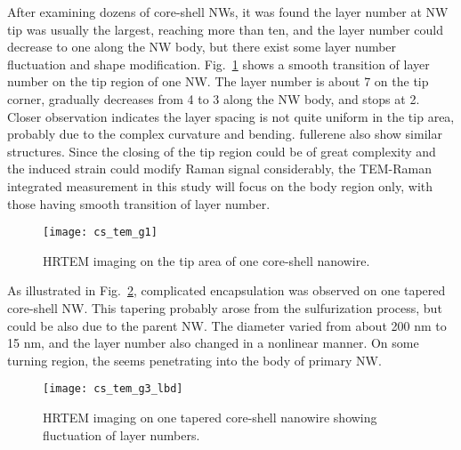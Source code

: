 After examining dozens of core-shell NWs, it was found the  layer number at NW tip was usually the largest, reaching more than ten, and the layer number could decrease to one along the NW body, but there exist some layer number fluctuation and shape modification. Fig.~\ref{fig:ch5ws2tem3} shows a smooth transition of  layer number on the tip region of one NW. The layer number is about 7 on the tip corner, gradually decreases from 4 to 3 along the NW body, and stops at 2. Closer observation indicates the layer spacing is not quite uniform in the tip area, probably due to the complex curvature and bending.  fullerene also show similar structures. Since the closing of the tip region could be of great complexity and the induced strain could modify Raman signal considerably, the TEM-Raman integrated measurement in this study will focus on the body region only, with those having smooth transition of layer number.
\begin{figure}[htb]
\centering
\texttt{[image: cs\_tem\_g1]}
\caption[HRTEM imaging on the tip area of one core-shell nanowire]{HRTEM imaging on the tip area of one core-shell nanowire.}
\label{fig:ch5ws2tem3}
\end{figure}
As illustrated in Fig.~\ref{fig:ch5ws2tem4}, complicated  encapsulation was observed on one tapered core-shell NW. This tapering probably arose from the sulfurization process, but could be also due to the parent  NW. The diameter varied from about 200 nm to 15 nm, and the  layer number also changed in a nonlinear manner. On some turning region, the  seems penetrating into the body of primary  NW. 
\begin{figure}[htb]
\centering
\texttt{[image: cs\_tem\_g3\_lbd]}
\caption[HRTEM imaging on one tapered core-shell nanowire showing fluctuation of layer numbers]{HRTEM imaging on one tapered core-shell nanowire showing fluctuation of layer numbers.}
\label{fig:ch5ws2tem4}
\end{figure}

